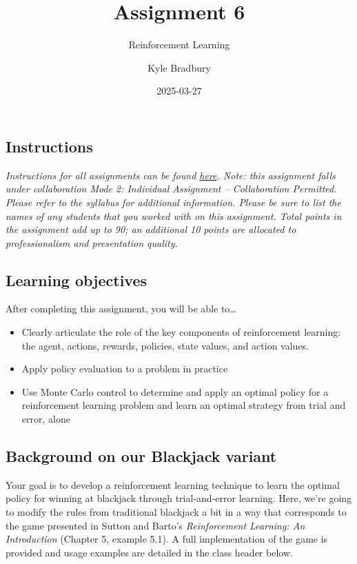 \documentclass[
  letterpaper,
  DIV=11,
  numbers=noendperiod]{scrartcl}
\title{Assignment 6}
\subtitle{Reinforcement Learning}
\author{Kyle Bradbury}
\date{2025-03-27}
\providecommand{\tightlist}{%
  \setlength{\itemsep}{0pt}\setlength{\parskip}{0pt}}\usepackage{longtable,booktabs,array}
\renewcommand*\contentsname{Table of contents}
\newcommand\contentsname{Table of contents}
\begin{document}
\maketitle

\renewcommand*\contentsname{Table of contents}
{
\hypersetup{linkcolor=}
\setcounter{tocdepth}{1}
\tableofcontents
}

\subsection{Instructions}\label{instructions}

\emph{Instructions for all assignments can be found
\href{https://kylebradbury.github.io/ids705/notebooks/assignment_instructions.html}{here}.
Note: this assignment falls under collaboration Mode 2: Individual
Assignment -- Collaboration Permitted. Please refer to the syllabus for
additional information. Please be sure to list the names of any students
that you worked with on this assignment. Total points in the assignment
add up to 90; an additional 10 points are allocated to professionalism
and presentation quality.}

\subsection{Learning objectives}\label{learning-objectives}

After completing this assignment, you will be able to\ldots{}

\begin{itemize}
\tightlist
\item
  Clearly articulate the role of the key components of reinforcement
  learning: the agent, actions, rewards, policies, state values, and
  action values.
\item
  Apply policy evaluation to a problem in practice
\item
  Use Monte Carlo control to determine and apply an optimal policy for a
  reinforcement learning problem and learn an optimal strategy from
  trial and error, alone
\end{itemize}

\subsection{Background on our Blackjack
variant}\label{background-on-our-blackjack-variant}

Your goal is to develop a reinforcement learning technique to learn the
optimal policy for winning at blackjack through trial-and-error
learning. Here, we're going to modify the rules from traditional
blackjack a bit in a way that corresponds to the game presented in
Sutton and Barto's \emph{Reinforcement Learning: An Introduction}
(Chapter 5, example 5.1). A full implementation of the game is provided
and usage examples are detailed in the class header below.
\end{document}
